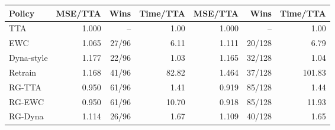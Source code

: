 \begin{tabular}{lrrrrrr}
\toprule
Policy & MSE/TTA & Wins & Time/TTA & MSE/TTA & Wins & Time/TTA \\
\midrule
TTA & 1.000 & -- & 1.00 & 1.000 & -- & 1.00 \\
EWC & 1.065 & 27/96 & 6.11 & 1.111 & 20/128 & 6.79 \\
Dyna-style & 1.177 & 22/96 & 1.03 & 1.165 & 32/128 & 1.04 \\
Retrain & 1.168 & 41/96 & 82.82 & 1.464 & 37/128 & 101.83 \\
RG-TTA & 0.950 & 61/96 & 1.41 & 0.919 & 85/128 & 1.44 \\
RG-EWC & 0.950 & 61/96 & 10.70 & 0.918 & 85/128 & 11.93 \\
RG-Dyna & 1.114 & 26/96 & 1.67 & 1.109 & 40/128 & 1.65 \\
\bottomrule
\end{tabular}
